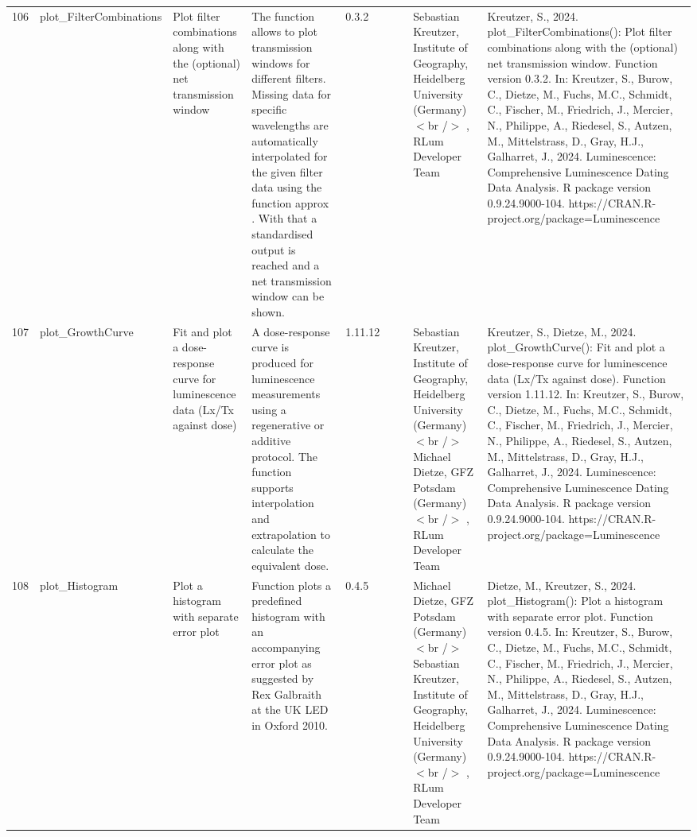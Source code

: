 \begin{table}[ht]
\begin{tabular}{rllllllll}
 \\ 
  106 & plot\_FilterCombinations & Plot filter combinations along with the (optional) net transmission window & The function allows to plot transmission windows for different filters. Missing data for specific wavelengths are automatically interpolated for the given filter data using the function  approx . With that a standardised output is reached and a net transmission window can be shown. & 0.3.2
 &  &  & Sebastian Kreutzer, Institute of Geography, Heidelberg University (Germany)$<$br /$>$ , RLum Developer Team & Kreutzer, S., 2024. plot\_FilterCombinations(): Plot filter combinations along with the (optional) net transmission window. Function version 0.3.2. In: Kreutzer, S., Burow, C., Dietze, M., Fuchs, M.C., Schmidt, C., Fischer, M., Friedrich, J., Mercier, N., Philippe, A., Riedesel, S., Autzen, M., Mittelstrass, D., Gray, H.J., Galharret, J., 2024. Luminescence: Comprehensive Luminescence Dating Data Analysis. R package version 0.9.24.9000-104. https://CRAN.R-project.org/package=Luminescence
 \\ 
  107 & plot\_GrowthCurve & Fit and plot a dose-response curve for luminescence data (Lx/Tx against dose) & A dose-response curve is produced for luminescence measurements using a regenerative or additive protocol. The function supports interpolation and extrapolation to calculate the equivalent dose. & 1.11.12
 &  &  & Sebastian Kreutzer, Institute of Geography, Heidelberg University (Germany) $<$br /$>$ Michael Dietze, GFZ Potsdam (Germany)$<$br /$>$ , RLum Developer Team & Kreutzer, S., Dietze, M., 2024. plot\_GrowthCurve(): Fit and plot a dose-response curve for luminescence data (Lx/Tx against dose). Function version 1.11.12. In: Kreutzer, S., Burow, C., Dietze, M., Fuchs, M.C., Schmidt, C., Fischer, M., Friedrich, J., Mercier, N., Philippe, A., Riedesel, S., Autzen, M., Mittelstrass, D., Gray, H.J., Galharret, J., 2024. Luminescence: Comprehensive Luminescence Dating Data Analysis. R package version 0.9.24.9000-104. https://CRAN.R-project.org/package=Luminescence
 \\ 
  108 & plot\_Histogram & Plot a histogram with separate error plot & Function plots a predefined histogram with an accompanying error plot as suggested by Rex Galbraith at the UK LED in Oxford 2010. & 0.4.5
 &  &  & Michael Dietze, GFZ Potsdam (Germany) $<$br /$>$ Sebastian Kreutzer, Institute of Geography, Heidelberg University (Germany)$<$br /$>$ , RLum Developer Team & Dietze, M., Kreutzer, S., 2024. plot\_Histogram(): Plot a histogram with separate error plot. Function version 0.4.5. In: Kreutzer, S., Burow, C., Dietze, M., Fuchs, M.C., Schmidt, C., Fischer, M., Friedrich, J., Mercier, N., Philippe, A., Riedesel, S., Autzen, M., Mittelstrass, D., Gray, H.J., Galharret, J., 2024. Luminescence: Comprehensive Luminescence Dating Data Analysis. R package version 0.9.24.9000-104. https://CRAN.R-project.org/package=Luminescence

\end{tabular}
\end{table}
